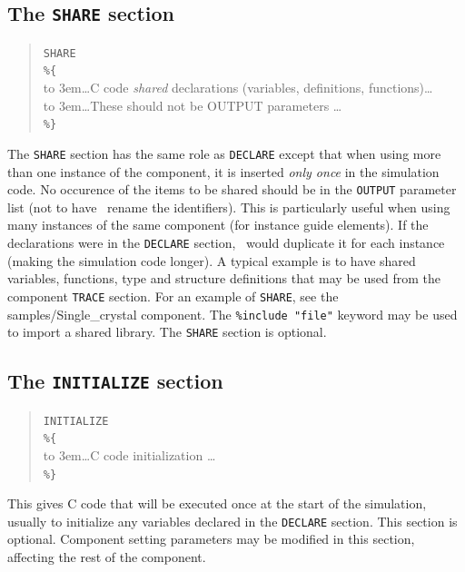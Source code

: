 \subsection{The \texttt{SHARE} section}
\label{s:comp-share}
\begin{quote}
  \texttt{SHARE} \\
  \verb|%{| \\
  \hbox to 3em{}\ldots C code \emph{shared} declarations (variables, definitions, functions)\ldots \\
  \hbox to 3em{}\ldots These should not be OUTPUT parameters \ldots \\
  \verb|%}|
\end{quote}

The \texttt{SHARE} section has the same role as \texttt{DECLARE} except that when using more than one instance of the component, it is inserted \emph{only once} in the simulation code. No occurence of the items to be shared should be in the \texttt{OUTPUT} parameter list (not to have \MCX\ rename the identifiers).
This is particularly useful when using many instances of the same component (for instance guide elements). If the declarations were in the \texttt{DECLARE} section, \MCX\ would duplicate it for each instance (making the simulation code longer).
A typical example is to have shared variables, functions, type and structure definitions that may be used from the component \texttt{TRACE} section. For an
example of \texttt{SHARE}, see the samples/Single\_crystal
component. The \verb+%include "file"+ keyword may be used to import
a shared library. The \texttt{SHARE} section is optional.

\subsection{The \texttt{INITIALIZE} section}
\label{s:comp-initialize}

\begin{quote}
  \texttt{INITIALIZE} \\
  \verb|%{| \\
  \hbox to 3em{}\ldots C code initialization \ldots \\
  \verb|%}|
\end{quote}
This gives C code that will be executed once at the start of the
simulation, usually to initialize any variables declared in the
\texttt{DECLARE} section. This section is optional. Component setting parameters may be modified in this section, affecting the rest of the component.


